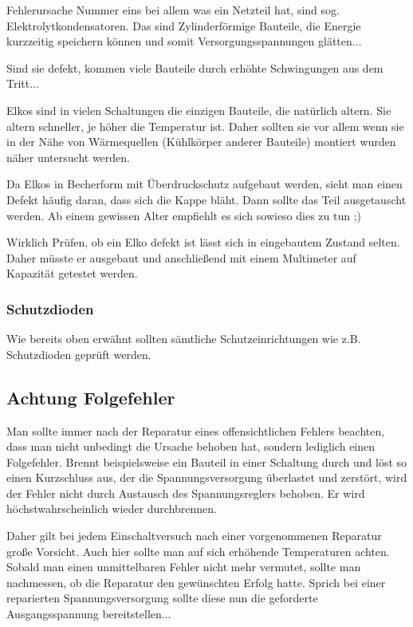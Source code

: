 Fehlerursache Nummer eins bei allem was ein Netzteil hat, sind sog. Elektrolytkondensatoren.
Das sind Zylinderförmige Bauteile, die Energie kurzzeitig speichern können und somit Versorgungsspannungen glätten...

Sind sie defekt, kommen viele Bauteile durch erhöhte Schwingungen aus dem Tritt...

Elkos sind in vielen Schaltungen die einzigen Bauteile, die natürlich altern.
Sie altern schneller, je höher die Temperatur ist.
Daher sollten sie vor allem wenn sie in der Nähe von Wärmequellen (Kühlkörper anderer Bauteile) montiert wurden näher untersucht werden.

Da Elkos in Becherform mit Überdruckschutz aufgebaut werden, sieht man einen Defekt häufig daran, dass sich die Kappe bläht. Dann sollte das Teil ausgetauscht werden.
Ab einem gewissen Alter empfiehlt es sich sowieso dies zu tun ;)

Wirklich Prüfen, ob ein Elko defekt ist lässt sich in eingebautem Zustand selten.
Daher müsste er ausgebaut und anschließend mit einem Multimeter auf Kapazität getestet werden.

\subsubsection{Schutzdioden}

Wie bereits oben erwähnt sollten sämtliche Schutzeinrichtungen wie z.B. Schutzdioden geprüft werden.

\subsection{Achtung Folgefehler}

Man sollte immer nach der Reparatur eines offensichtlichen Fehlers beachten, dass man nicht unbedingt die Ursache behoben hat, sondern lediglich einen Folgefehler.
Brennt beispielsweise ein Bauteil in einer Schaltung durch und löst so einen Kurzschluss aus, der die Spannungsversorgung überlastet und zerstört, wird der Fehler nicht durch Austausch des Spannungsreglers behoben. Er wird höchstwahrscheinlich wieder durchbrennen.

Daher gilt bei jedem Einschaltversuch nach einer vorgenommenen Reparatur große Vorsicht.
Auch hier sollte man auf sich erhöhende Temperaturen achten.
Sobald man einen unmittelbaren Fehler nicht mehr vermutet, sollte man nachmessen, ob die Reparatur den gewünschten Erfolg hatte. Sprich bei einer reparierten Spannungsversorgung sollte diese nun die geforderte Ausgangsspannung bereitstellen...

%
%
%

